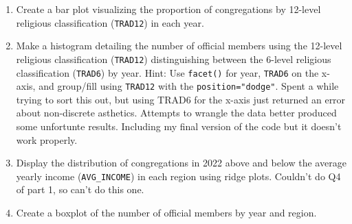 \documentclass[12pt,letterpaper]{article}
\begin{document}
\begin{enumerate}
	\item Create a bar plot visualizing the proportion of congregations by 12-level religious classification (\texttt{TRAD12}) in each year.
	
	\item Make a histogram detailing the number of official members using the 12-level religious classification (\texttt{TRAD12}) distinguishing between the 6-level religious classification (\texttt{TRAD6}) by year. Hint: Use \texttt{facet()} for year, \texttt{TRAD6} on the x-axis, and group/fill using \texttt{TRAD12} with the \texttt{position="dodge"}.
	Spent a while trying to sort this out, but using TRAD6 for the x-axis just returned an error about non-discrete asthetics. Attempts to wrangle the data better produced some unfortunte results. Including my final version of the code but it doesn't work properly.
	
	
	\item Display the distribution of congregations in 2022 above and below the average yearly income (\texttt{AVG\_INCOME}) in each region using ridge plots.
	Couldn't do Q4 of part 1, so can't do this one.
	\item Create a boxplot of the number of official members by year and region.
	

\end{enumerate}
\end{document}
